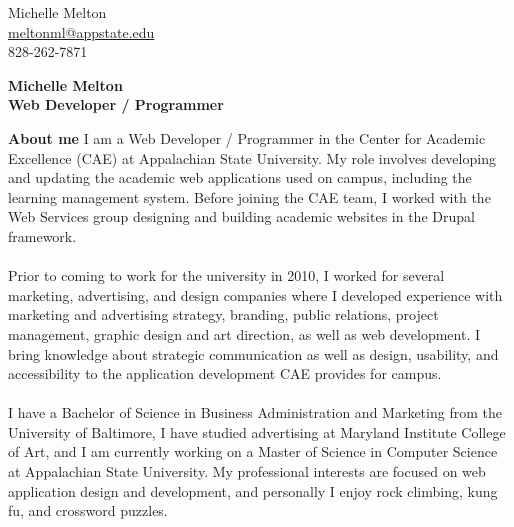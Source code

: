 \documentclass[a4paper,12pt,final]{memoir}
\newcommand{\Sep}{\vspace{1.5em}}
\newenvironment{AboutMe}
	{\ignorespaces\textbf{\color{BrickRed} About me}}
	{\Sep\ignorespacesafterend}
\begin{document}
\begin{flushright}\small
	Michelle Melton\\
	\url{meltonml@appstate.edu}\\
	828-262-7871
\end{flushright}\normalsize
\framebreak


\Huge\bfseries {\color{BrickRed} Michelle Melton}\\
\Large\bfseries  Web Developer / Programmer\\

\normalsize\normalfont

\begin{AboutMe}
I am a Web Developer / Programmer in the Center for Academic Excellence (CAE) at Appalachian State University. My role involves developing and updating the academic web applications used on campus, including the learning management system. Before joining the CAE team, I worked with the Web Services group designing and building academic websites in the Drupal framework.\\\\
Prior to coming to work for the university in 2010, I worked for several marketing, advertising, and design companies where I developed experience with marketing and advertising strategy, branding, public relations, project management, graphic design and art direction, as well as web development. I bring knowledge about strategic communication as well as design, usability, and accessibility to the application development CAE provides for campus.\\\\
I have a Bachelor of Science in Business Administration and Marketing from the University of Baltimore, I have studied advertising at Maryland Institute College of Art, and I am currently working on a Master of Science in Computer Science at Appalachian State University. My professional interests are focused on web application design and development, and personally I enjoy rock climbing, kung fu, and crossword puzzles.
\end{AboutMe}
\end{document}
